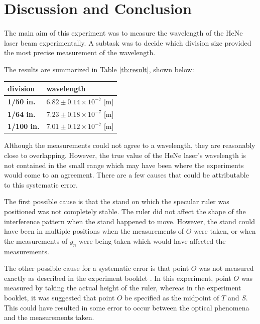 \documentclass{article}
\begin{document}
\section{Discussion and Conclusion}
\paragraph{}
The main aim of this experiment was to measure the wavelength of the HeNe laser beam experimentally. A subtask was to decide which division size provided the most precise measurement of the wavelength.

The results are summarized in Table \ref{tb:result}, shown below:

\begin{table}[H]
\begin{tabular}{|l|l|}
\hline
\textbf{division}  & \textbf{wavelength}                 \\ \hline
\textbf{1/50 in.}  & $6.82 \pm 0.14 \times 10^{-7}$ [m] \\ \hline
\textbf{1/64 in.}  & $7.23 \pm 0.18 \times 10^{-7}$ [m] \\ \hline
\textbf{1/100 in.} & $7.01 \pm 0.12 \times 10^{-7}$ [m] \\ \hline
\end{tabular}
\end{table}

Although the measurements could not agree to a wavelength, they are reasonably close to overlapping. However, the true value of the HeNe laser's wavelength is not contained in the small range which may have been where the experiments would come to an agreement.  There are a few causes that could be attributable to this systematic error.

The first possible cause is that the stand on which the specular ruler was positioned was not completely stable. The ruler did not affect the shape of the interference pattern when the stand happened to move. However, the stand could have been in multiple positions when the measurements of $O$ were taken, or when the measurements of $y_n$ were being taken which would have affected the measurements.

The other possible cause for a systematic error is that point $O$ was not measured exactly as described in the experiment booklet \autocite{UPCSE2018}. In this experiment, point $O$ was measured by taking the actual height of the ruler, whereas in the experiment booklet, it was suggested that point $O$ be specified as the midpoint of $T$ and $S$. This could have resulted in some error to occur between the optical phenomena and the measurements taken.
\end{document}
